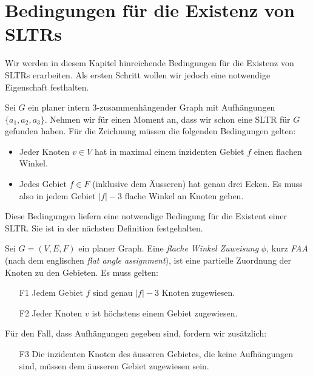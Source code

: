 \chapter{Bedingungen für die Existenz von SLTRs}\label{main_theory}

Wir werden in diesem Kapitel hinreichende Bedingungen für die Existenz von SLTRs erarbeiten. Als ersten Schritt wollen wir jedoch eine notwendige Eigenschaft festhalten.

Sei $G$ ein planer intern 3-zusammenhängender Graph mit Aufhängungen $\{a_1,a_2,a_3\}$. Nehmen wir für einen Moment an, dass wir schon eine SLTR für $G$ gefunden haben. Für die Zeichnung müssen die folgenden Bedingungen gelten:

\begin{itemize}
\item Jeder Knoten $v \in V$ hat in maximal einem inzidenten Gebiet $f$ einen flachen Winkel.
\item Jedes Gebiet $f \in F$ (inklusive dem Äusseren) hat genau drei Ecken. Es muss also in jedem Gebiet $|f|-3$ flache Winkel an Knoten geben.
\end{itemize}

Diese Bedingungen liefern eine notwendige Bedingung für die Existent einer SLTR. Sie ist in der nächsten Definition festgehalten.

\begin{definition}[FAA]\label{def_faa}
Sei $G=(V,E,F)$ ein planer Graph. Eine \textit{flache Winkel Zuweisung} $\phi$, kurz \textit{FAA} (nach dem englischen \textit{flat angle assignment}), ist eine partielle Zuordnung der Knoten zu den Gebieten. Es muss gelten:
\begin{itemize}
\item [F1] Jedem Gebiet $f$ sind genau $|f|-3$ Knoten zugewiesen.
\item [F2] Jeder Knoten $v$ ist höchstens einem Gebiet zugewiesen.
\end{itemize}
Für den Fall, dass Aufhängungen gegeben sind, fordern wir zusätzlich:
\begin{itemize}
\item [F3] Die inzidenten Knoten des äusseren Gebietes, die keine Aufhängungen sind, müssen dem äusseren Gebiet zugewiesen sein.
\end{itemize}

\end{definition}

